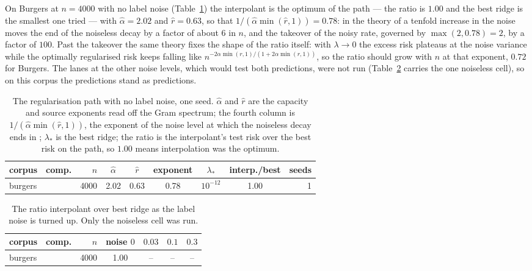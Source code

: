 \documentclass[11pt]{article}
\theoremstyle{definition}
\newcommand{\numBurgAlpha}{2.02}
\newcommand{\numBurgExp}{0.78}
\newcommand{\numBurgFactor}{6}
\newcommand{\numBurgR}{0.63}
\newcommand{\numBurgRate}{0.72}
\newcommand{\numBurgTakeover}{100}
\newcommand{\numBurgTakeoverExp}{2}
\begin{document}
On Burgers at $n=4000$ with no label noise (Table~\ref{tab:regpath}) the interpolant is the optimum
of the path --- the ratio is $1.00$ and the best ridge is the smallest one tried --- with
$\hat\alpha=\numBurgAlpha$ and $\hat r=\numBurgR$, so that $1/(\hat\alpha\min(\hat r,1))=\numBurgExp$:
in the theory of \cite{Cui} a tenfold increase in the noise moves the end of the noiseless decay by a
factor of about $\numBurgFactor$ in $n$, and the takeover of the noisy rate, governed by
$\max(2,\numBurgExp)=\numBurgTakeoverExp$, by a factor of $\numBurgTakeover$. Past the takeover the
same theory fixes the shape of the ratio itself: with
$\lambda\to0$ the excess risk plateaus at the noise variance while the optimally regularised risk
keeps falling like $n^{-2\alpha\min(r,1)/(1+2\alpha\min(r,1))}$, so the ratio should grow with $n$
at that exponent, $\numBurgRate$ for Burgers. The lanes at the other noise levels, which would test
both predictions, were not run (Table~\ref{tab:crossover} carries the one noiseless cell), so on
this corpus the predictions stand as predictions.

\begin{table}[t]
\centering\small
\caption{The regularisation path with no label noise, one seed. $\hat\alpha$ and $\hat r$ are the
capacity and source exponents read off the Gram spectrum; the fourth column is
$1/(\hat\alpha\min(\hat r,1))$, the exponent of the noise level at which the noiseless decay ends in
\cite{Cui}; $\lambda_\ast$ is the best ridge; the ratio is the
interpolant's test risk over the best risk on the path, so $1.00$ means interpolation was the
optimum.}
\label{tab:regpath}
\begin{tabular}{@{}llrcccccr@{}}
\toprule
corpus & comp. & $n$ & $\hat\alpha$ & $\hat r$ & exponent & $\lambda_\ast$ & interp./best & seeds\\
\midrule
burgers &  & 4000 & 2.02 & 0.63 & 0.78 & $10^{-12}$ & 1.00 & 1\\
\bottomrule
\end{tabular}
\end{table}

\begin{table}[t]
\centering\small
\caption{The ratio interpolant over best ridge as the label noise is turned up. Only the noiseless
cell was run.}
\label{tab:crossover}
\begin{tabular}{@{}llrcccc@{}}
\toprule
corpus & comp. & $n$ & noise $0$ & $0.03$ & $0.1$ & $0.3$\\
\midrule
burgers &  & 4000 & 1.00 & -- & -- & --\\
\bottomrule
\end{tabular}
\end{table}
\end{document}
